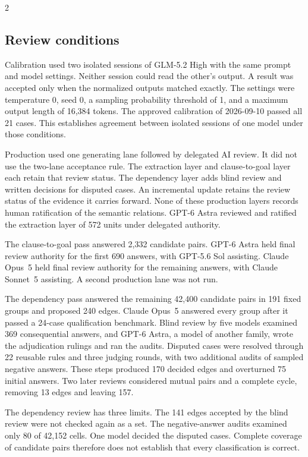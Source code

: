 \begin{multicols}{2}
\subsection{Review conditions}

Calibration used two isolated sessions of GLM-5.2 High with the same prompt and model settings. Neither session could read the other's output. A result was accepted only when the normalized outputs matched exactly. The settings were temperature 0, seed 0, a sampling probability threshold of 1, and a maximum output length of 16,384 tokens. The approved calibration of 2026-09-10 passed all 21 cases. This establishes agreement between isolated sessions of one model under those conditions.

Production used one generating lane followed by delegated AI review. It did not use the two-lane acceptance rule. The extraction layer and clause-to-goal layer each retain that review status. The dependency layer adds blind review and written decisions for disputed cases. An incremental update retains the review status of the evidence it carries forward. None of these production layers records human ratification of the semantic relations. GPT-6 Astra reviewed and ratified the extraction layer of 572 units under delegated authority.

The clause-to-goal pass answered 2,332 candidate pairs. GPT-6 Astra held final review authority for the first 690 answers, with GPT-5.6 Sol assisting. Claude Opus~5 held final review authority for the remaining answers, with Claude Sonnet~5 assisting. A second production lane was not run.

The dependency pass answered the remaining 42,400 candidate pairs in 191 fixed groups and proposed 240 edges. Claude Opus~5 answered every group after it passed a 24-case qualification benchmark. Blind review by five models examined 369 consequential answers, and GPT-6 Astra, a model of another family, wrote the adjudication rulings and ran the audits. Disputed cases were resolved through 22 reusable rules and three judging rounds, with two additional audits of sampled negative answers. These steps produced 170 decided edges and overturned 75 initial answers. Two later reviews considered mutual pairs and a complete cycle, removing 13 edges and leaving 157.

The dependency review has three limits. The 141 edges accepted by the blind review were not checked again as a set. The negative-answer audits examined only 80 of 42,152 cells. One model decided the disputed cases. Complete coverage of candidate pairs therefore does not establish that every classification is correct.


\end{multicols}
